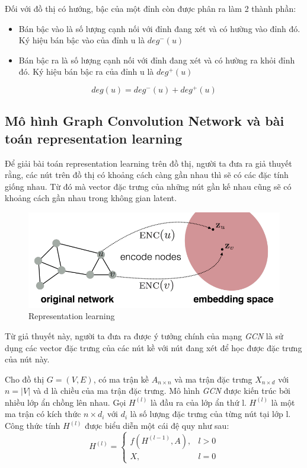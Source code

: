 Đối với đồ thị có hướng, bậc của một đỉnh còn được phân ra làm 2 thành phần:
\begin{itemize}
	\item Bán bậc vào là số lượng cạnh nối với đỉnh đang xét và có hường vào đỉnh đó. Ký hiệu bán bậc vào của đỉnh u là $deg^-(u)$
	\item Bán bậc ra là số lượng cạnh nối với đỉnh đang xét và có hường ra khỏi đỉnh đó. Ký hiệu bán bậc ra của đỉnh u là $deg^+(u)$
\end{itemize}

\begin{equation*}
	deg(u) = deg^-(u) + deg^+(u)
\end{equation*}

\subsection{Mô hình Graph Convolution Network và bài toán representation learning}

Để giải bài toán representation learning trên đồ thị, người ta đưa ra giả thuyết rằng, các nút trên đồ thị có khoảng cách càng gần nhau thì sẽ có các đặc tính giống nhau. Từ đó mà vector đặc trưng của những nút gần kế nhau cũng sẽ có khoảng cách gần nhau trong không gian latent.

\begin{figure}[H]
    \begin{center}
        \includegraphics[scale=0.5]{images/representation-learning}
        \caption{Representation learning}
        \label{fig:representation-learning}
    \end{center}
\end{figure}


Từ giả thuyết này, người ta đưa ra được ý tưởng chính của mạng \textit{GCN} là sử dụng các vector đặc trưng của các nút kề với nút đang xét để học được đặc trưng của nút này.

Cho đồ thị $G = (V,E)$, có ma trận kề $A_{n \times n}$ và ma trận đặc trưng $X_{n \times d}$ với $n = |V|$ và d là chiều của ma trận đặc trưng. Mô hình \textit{GCN} được kiến trúc bởi nhiều lớp ẩn chồng lên nhau. Gọi $H^{(l)}$ là đầu ra của lớp ẩn thứ l. $H^{(l)}$ là một ma trận có kích thức $n \times d_i$ với $d_i$ là số lượng đặc trưng của từng nút tại lớp l. Công thức tính $H^{(l)}$ được biểu diễn một cái đệ quy như sau:
\begin{equation*}
	H^{(l)} = 
	\begin{cases}
		f(H^{(l-1)}, A), & l > 0 \\
		X, & l = 0		
	\end{cases}
\end{equation*}

